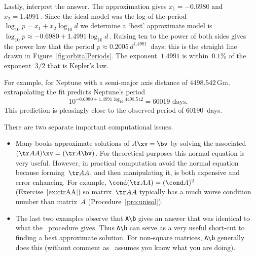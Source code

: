 \begin{example}
\begin{solution}
Lastly, interpret the answer.
The approximation gives \(x_1=-0.6980\) and \(x_2=1.4991\)\,.  
Since the ideal model was the log of the period \(\log_{10}p=x_1+x_2\log_{10}d\) we determine a `best' approximate model is \(\log_{10}p\approx-0.6980+1.4991\log_{10}d\)\,. 
Raising ten to the power of both sides gives the power law that the period \(p\approx0.2005\,d^{1.4991}\)~days: this is the straight line drawn in Figure~\ref{fig:orbitalPeriods}.
The exponent~\(1.4991\) is within~\(0.1\)\% of the exponent~\(3/2\) that is Kepler's law.

For example, for Neptune with a semi-major axis distance of \(4498.542\)\,Gm, extrapolating the fit predicts Neptune's period\[10^{-0.6980+1.4991\log_{10}4498.542}=60019\text{ days.}\]
This prediction is pleasingly close to the observed period of \(60190\)~days.
\end{solution}
\end{example}





\begin{compute}
There are two separate important computational issues.
\begin{itemize}
\item Many books approximate solutions of \(A\xv=\bv\) by solving the associated  \((\tr AA)\xv=(\tr A\bv)\).  
For theoretical purposes this normal equation is very useful.  
However, in practical computation avoid the normal equation because forming~\(\tr AA\), and then manipulating it, is both expensive and error enhancing.
For example, \(\cond(\tr AA)=(\cond A)^2\) (Exercise~\ref{ex:ctrAA}) so matrix~\(\tr AA\) typically has a much worse condition number than matrix~\(A\) (Procedure~\ref{pro:unisol}).

\item The last two examples observe that \verb|A\b| gives an answer that was identical to what the \svd\ procedure gives.
Thus \verb|A\b| can serve as a very useful short-cut to finding a best approximate solution.
For non-square matrices, \verb|A\b| generally does this (without comment as \script\ assumes you know what you are doing).
\end{itemize}
\end{compute}



\begin{comment}
\nakos{\S8.9} has some useful applications to USA NRL rating of quarterbacks---using data from \emph{The Sports Illustrated 19xx Sports Almanac}.
\end{comment}





